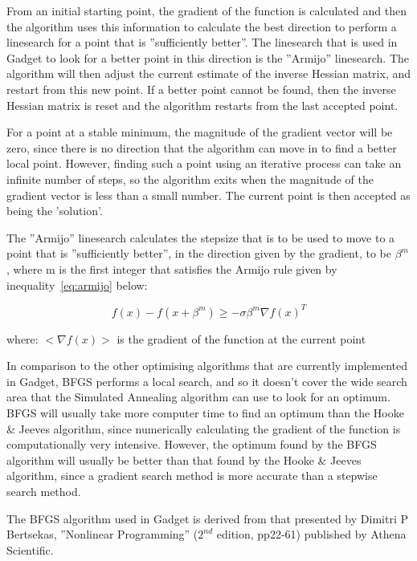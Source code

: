 \documentclass [a4paper, 10pt]{book}
\begin{document}
\bigskip
From an initial starting point, the gradient of the function is calculated and then the algorithm uses this information to calculate the best direction to perform a linesearch for a point that is ''sufficiently better''.  The linesearch that is used in Gadget to look for a better point in this direction is the ''Armijo'' linesearch.  The algorithm will then adjust the current estimate of the inverse Hessian matrix, and restart from this new point.  If a better point cannot be found, then the inverse Hessian matrix is reset and the algorithm restarts from the last accepted point.

\bigskip
For a point at a stable minimum, the magnitude of the gradient vector will be zero, since there is no direction that the algorithm can move in to find a better local point.  However, finding such a point using an iterative process can take an infinite number of steps, so the algorithm exits when the magnitude of the gradient vector is less than a small number.  The current point is then accepted as being the 'solution'.

\bigskip
The ''Armijo'' linesearch calculates the stepsize that is to be used to move to a point that is ''sufficiently better'', in the direction given by the gradient, to be $\beta^m$, where m is the first integer that satisfies the Armijo rule given by inequality~\ref{eq:armijo} below:

\begin{equation}\label{eq:armijo}
f(x) - f(x + \beta^{m}) \geq - \sigma \beta^{m} \nabla f(x) ^{T}
\end{equation}

where:\newline
$<\nabla f(x)>$ is the gradient of the function at the current point

\bigskip
In comparison to the other optimising algorithms that are currently implemented in Gadget, BFGS performs a local search, and so it doesn't cover the wide search area that the Simulated Annealing algorithm can use to look for an optimum.  BFGS will usually take more computer time to find an optimum than the Hooke \& Jeeves algorithm, since numerically calculating the gradient of the function is computationally very intensive.  However, the optimum found by the BFGS algorithm will usually be better than that found by the Hooke \& Jeeves algorithm, since a gradient search method is more accurate than a stepwise search method.

\bigskip
The BFGS algorithm used in Gadget is derived from that presented by Dimitri P Bertsekas, ''Nonlinear Programming'' ($2^{nd}$ edition, pp22-61) published by Athena Scientific.
\end{document}
